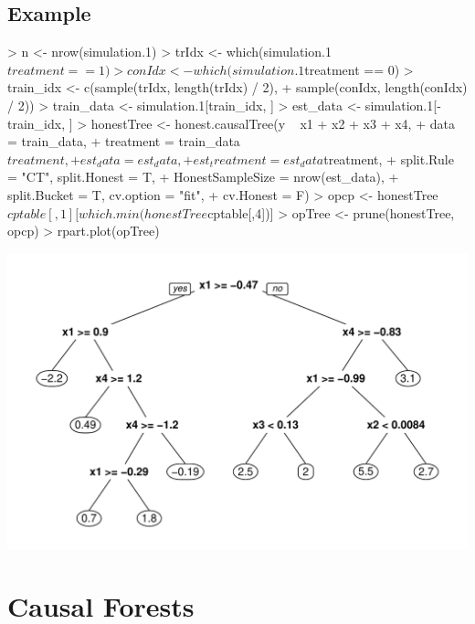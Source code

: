 \documentclass[11pt]{article}
\renewenvironment{Schunk}{\vspace{\topsep}}{\vspace{\topsep}}
\begin{document}
\subsection{Example}
\begin{Schunk}
\begin{Sinput}
> n <- nrow(simulation.1)
> trIdx <- which(simulation.1$treatment == 1)
> conIdx <- which(simulation.1$treatment == 0)
> train_idx <- c(sample(trIdx, length(trIdx) / 2),
+                sample(conIdx, length(conIdx) / 2))
> train_data <- simulation.1[train_idx, ]
> est_data <- simulation.1[-train_idx, ]
> honestTree <- honest.causalTree(y ~ x1 + x2 + x3 + x4,
+                       data = train_data,
+                       treatment = train_data$treatment,
+                       est_data = est_data,
+                       est_treatment = est_data$treatment,
+                       split.Rule = "CT", split.Honest = T,
+                       HonestSampleSize = nrow(est_data),
+                       split.Bucket = T, cv.option = "fit",
+                       cv.Honest = F)
> opcp <-  honestTree$cptable[,1][which.min(honestTree$cptable[,4])]
> opTree <- prune(honestTree, opcp)
> rpart.plot(opTree)
\end{Sinput}
\end{Schunk}
\includegraphics{briefintro-example3}

\section{Causal Forests}
\end{document}
